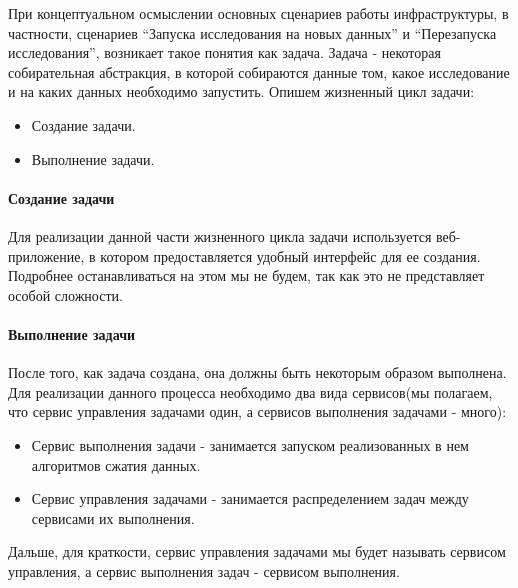 \documentclass[12pt,a4paper]{extarticle}
\begin{document}
При концептуальном осмыслении основных сценариев работы инфраструктуры, в частности, сценариев ``Запуска исследования на новых данных'' и 
``Перезапуска исследования'', возникает такое понятия как задача. Задача - некоторая собирательная абстракция, в которой собираются данные том, какое исследование и на каких данных необходимо запустить. Опишем жизненный цикл задачи:
\begin{itemize}
	\item Создание задачи.
	\item Выполнение задачи.
\end{itemize}

\paragraph{Создание задачи}
Для реализации данной части жизненного цикла задачи используется веб-приложение, в котором предоставляется удобный интерфейс для ее создания. Подробнее останавливаться на этом мы не будем, так как это не представляет особой сложности.

\paragraph{Выполнение задачи}
После того, как задача создана, она должны быть некоторым образом выполнена. Для реализации данного процесса необходимо два вида сервисов(мы полагаем, что сервис управления задачами один, а сервисов выполнения задачами - много):
\begin{itemize}
	\item Сервис выполнения задачи - занимается запуском реализованных в нем алгоритмов сжатия данных. 
	\item Сервис управления задачами - занимается распределением задач между сервисами их выполнения.
\end{itemize}
Дальше, для краткости, сервис управления задачами мы будет называть сервисом управления, а сервис выполнения задач - сервисом выполнения.
\end{document}
